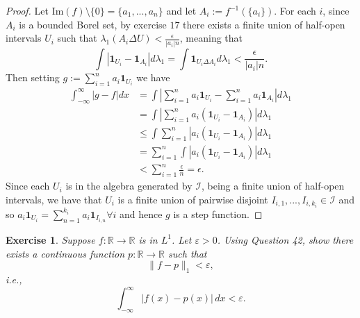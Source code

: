\documentclass{article}
\newtheorem{exercise}[theorem]{Exercise}
\begin{document}
\begin{proof}
Let $\text{Im}(f)\setminus\{0\}=\{a_1,...,a_n\}$ and let $A_i:=f^{-1}(\{a_i\})$. For each $i$, since $A_i$ is a bounded Borel set, by exercise $17$ there exists a finite union of half-open intervals $U_i$ such that $\lambda_1(A_i\Delta U)<\frac{\epsilon}{|a_i|n}$, meaning that \[\int|\mathbf{1}_{U_i}-\mathbf{1}_{A_i}|d\lambda_1=\int\mathbf{1}_{U_i\Delta A_i}d\lambda_1<\frac{\epsilon}{|a_i|n}.\] Then setting $g:=\sum_{i=1}^na_i\mathbf{1}_{U_i}$ we have\begin{align*}\int_{-\infty}^\infty|g-f|dx&=\int|\sum_{i=1}^na_i\mathbf{1}_{U_i}-\sum_{i=1}^na_i\mathbf{1}_{A_i}|d\lambda_1\\&=\int|\sum_{i=1}^na_i(\mathbf{1}_{U_i}-\mathbf{1}_{A_i})|d\lambda_1\\&\leq\int\sum_{i=1}^n|a_i(\mathbf{1}_{U_i}-\mathbf{1}_{A_i})|d\lambda_1\\&=\sum_{i=1}^n\int|a_i(\mathbf{1}_{U_i}-\mathbf{1}_{A_i})|d\lambda_1\\&<\sum_{i=1}^n\frac{\epsilon}{n}=\epsilon.\end{align*} Since each $U_i$ is in the algebra generated by $\mathcal{I}$, being a finite union of half-open intervals, we have that $U_i$ is a finite union of pairwise disjoint $I_{i,1},...,I_{i,k_i}\in\mathcal{I}$ and so $a_i\mathbf{1}_{U_i}=\sum_{n=1}^{k_i}a_i\mathbf{1}_{I_{i,n}}\forall i$ and hence $g$ is a step function.
\end{proof}
\begin{exercise}
Suppose \( f : \mathbb{R} \to \mathbb{R} \) is in \( L^1 \). Let \( \varepsilon > 0 \). Using Question 42, show there exists a continuous function \( p : \mathbb{R} \to \mathbb{R} \) such that 
\[
\|f - p\|_1 < \varepsilon,
\]
i.e., 
\[
\int_{-\infty}^{\infty} |f(x) - p(x)| \,dx < \varepsilon.
\]
\end{exercise}
\end{document}
